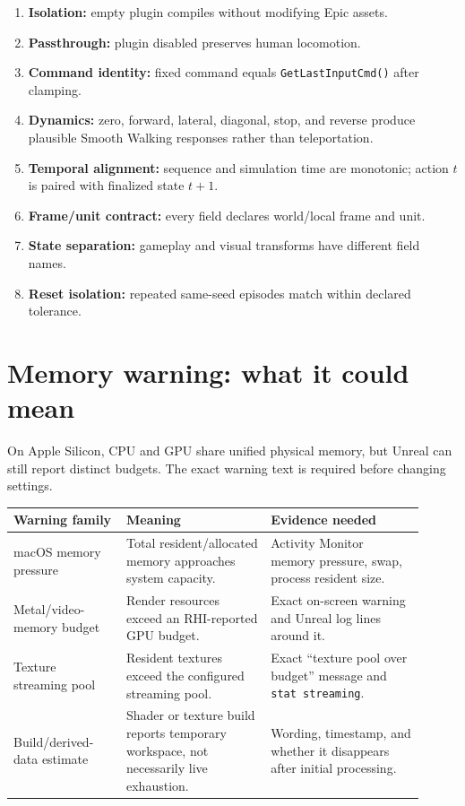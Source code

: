 \documentclass[11pt]{article}
\begin{document}
\begin{enumerate}
  \item \textbf{Isolation:} empty plugin compiles without modifying Epic assets.
  \item \textbf{Passthrough:} plugin disabled preserves human locomotion.
  \item \textbf{Command identity:} fixed command equals \texttt{GetLastInputCmd()} after clamping.
  \item \textbf{Dynamics:} zero, forward, lateral, diagonal, stop, and reverse produce plausible
  Smooth Walking responses rather than teleportation.
  \item \textbf{Temporal alignment:} sequence and simulation time are monotonic; action $t$ is paired
  with finalized state $t+1$.
  \item \textbf{Frame/unit contract:} every field declares world/local frame and unit.
  \item \textbf{State separation:} gameplay and visual transforms have different field names.
  \item \textbf{Reset isolation:} repeated same-seed episodes match within declared tolerance.
\end{enumerate}

\section{Memory warning: what it could mean}\label{sec:memory}

On Apple Silicon, CPU and GPU share unified physical memory, but Unreal can still report distinct
budgets. The exact warning text is required before changing settings.

\begin{tabular}{p{0.25\linewidth}p{0.32\linewidth}p{0.34\linewidth}}
\toprule
Warning family & Meaning & Evidence needed \\
\midrule
macOS memory pressure & Total resident/allocated memory approaches system capacity. & Activity
Monitor memory pressure, swap, process resident size. \\
Metal/video-memory budget & Render resources exceed an RHI-reported GPU budget. & Exact on-screen
warning and Unreal log lines around it. \\
Texture streaming pool & Resident textures exceed the configured streaming pool. & Exact
``texture pool over budget'' message and \texttt{stat streaming}. \\
Build/derived-data estimate & Shader or texture build reports temporary workspace, not necessarily
live exhaustion. & Wording, timestamp, and whether it disappears after initial processing. \\
\bottomrule
\end{tabular}
\end{document}
